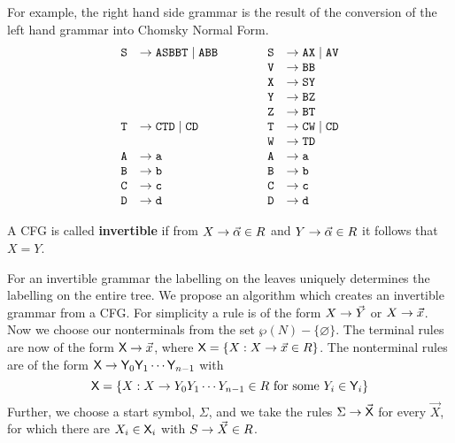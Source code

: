 For example, the right hand side grammar is the result of the
conversion of the left hand grammar into Chomsky Normal Form.
\begin{equation}
\begin{array}{ll@{\qquad\qquad}ll}
\mbox{\tt S} & \pf \mbox{\tt ASBBT} \mid \mbox{\tt ABB}
    & \mbox{\tt S} & \pf \mbox{\tt AX} \mid \mbox{\tt AV} \\
& & \mbox{\tt V} & \pf \mbox{\tt BB} \\
& & \mbox{\tt X} & \pf \mbox{\tt SY} \\
& & \mbox{\tt Y} & \pf \mbox{\tt BZ} \\
& & \mbox{\tt Z} & \pf \mbox{\tt BT} \\
\mbox{\tt T} & \pf \mbox{\tt CTD} \mid \mbox{\tt CD}
    & \mbox{\tt T} & \pf \mbox{\tt CW} \mid \mbox{\tt CD} \\
& & \mbox{\tt W} & \pf \mbox{\tt TD} \\
\mbox{\tt A} & \pf \mbox{\tt a} & \mbox{\tt A} & \pf \mbox{\tt a} \\
\mbox{\tt B} & \pf \mbox{\tt b} & \mbox{\tt B} & \pf \mbox{\tt b} \\
\mbox{\tt C} & \pf \mbox{\tt c} & \mbox{\tt C} & \pf \mbox{\tt c} \\
\mbox{\tt D} & \pf \mbox{\tt d} & \mbox{\tt D} & \pf \mbox{\tt d}
\end{array}
\end{equation}
\begin{defn}
A CFG is called \textbf{invertible}
if from $X \rightarrow \vec{\alpha} \in R$ and $Y \rightarrow \vec{\alpha}
\in R$ it follows that $X = Y$.
\end{defn}
For an invertible grammar the labelling on the leaves uniquely
determines the labelling on the entire tree. We propose an algorithm
which creates an invertible grammar from a CFG.
For simplicity a rule is of the form $X \rightarrow \vec{Y}$ or
$X \rightarrow \vec{x}$. Now we choose our
nonterminals from the set $\wp(N) - \{\varnothing\}$. The
terminal rules are now of the form $\textsf{X} \rightarrow \vec{x}$, where
$\textsf{X} = \{X : X \rightarrow \vec{x} \in R\}$.  The nonterminal rules
are of the form $\textsf{X} \rightarrow \textsf{Y}_0 \textsf{Y}_1 \dotsb \textsf{Y}_{n-1}$ with
\begin{equation}
\textsf{X} = \{X : X \rightarrow Y_0 Y_1 \dotsb Y_{n-1} \in R
\text{ for some }Y_i \in \textsf{Y}_i\} 
\end{equation}
Further, we choose a start symbol, $\Sigma$, and we take
the rules $\Sigma \rightarrow \vec{\textsf{X}}$ for every $\vec{X}$, for
which there are $X_i \in \textsf{X}_i$ with $S \rightarrow \vec{X} \in R$.
